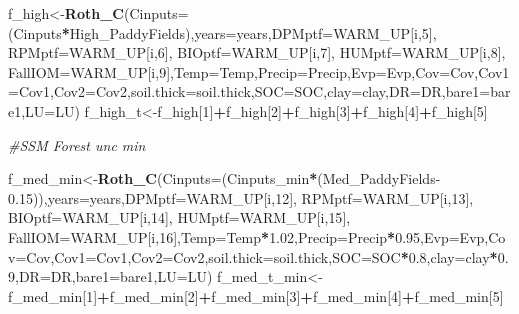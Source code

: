 \documentclass[
  10pt,
  b5paper,
]{book}
\newenvironment{Shaded}{\begin{snugshade}}{\end{snugshade}}
\newcommand{\CommentTok}[1]{\textcolor[rgb]{0.56,0.35,0.01}{\textit{#1}}}
\newcommand{\DataTypeTok}[1]{\textcolor[rgb]{0.13,0.29,0.53}{#1}}
\newcommand{\DecValTok}[1]{\textcolor[rgb]{0.00,0.00,0.81}{#1}}
\newcommand{\FloatTok}[1]{\textcolor[rgb]{0.00,0.00,0.81}{#1}}
\newcommand{\KeywordTok}[1]{\textcolor[rgb]{0.13,0.29,0.53}{\textbf{#1}}}
\newcommand{\NormalTok}[1]{#1}
\newcommand{\OperatorTok}[1]{\textcolor[rgb]{0.81,0.36,0.00}{\textbf{#1}}}
\begin{document}
\begin{Shaded}
\begin{Highlighting}[]
\NormalTok{f_high<-}\KeywordTok{Roth_C}\NormalTok{(}\DataTypeTok{Cinputs=}\NormalTok{(Cinputs}\OperatorTok{*}\NormalTok{High_PaddyFields),}\DataTypeTok{years=}\NormalTok{years,}\DataTypeTok{DPMptf=}\NormalTok{WARM_UP[i,}\DecValTok{5}\NormalTok{], }\DataTypeTok{RPMptf=}\NormalTok{WARM_UP[i,}\DecValTok{6}\NormalTok{], }\DataTypeTok{BIOptf=}\NormalTok{WARM_UP[i,}\DecValTok{7}\NormalTok{], }\DataTypeTok{HUMptf=}\NormalTok{WARM_UP[i,}\DecValTok{8}\NormalTok{], }\DataTypeTok{FallIOM=}\NormalTok{WARM_UP[i,}\DecValTok{9}\NormalTok{],}\DataTypeTok{Temp=}\NormalTok{Temp,}\DataTypeTok{Precip=}\NormalTok{Precip,}\DataTypeTok{Evp=}\NormalTok{Evp,}\DataTypeTok{Cov=}\NormalTok{Cov,}\DataTypeTok{Cov1=}\NormalTok{Cov1,}\DataTypeTok{Cov2=}\NormalTok{Cov2,}\DataTypeTok{soil.thick=}\NormalTok{soil.thick,}\DataTypeTok{SOC=}\NormalTok{SOC,}\DataTypeTok{clay=}\NormalTok{clay,}\DataTypeTok{DR=}\NormalTok{DR,}\DataTypeTok{bare1=}\NormalTok{bare1,}\DataTypeTok{LU=}\NormalTok{LU)}
\NormalTok{f_high_t<-f_high[}\DecValTok{1}\NormalTok{]}\OperatorTok{+}\NormalTok{f_high[}\DecValTok{2}\NormalTok{]}\OperatorTok{+}\NormalTok{f_high[}\DecValTok{3}\NormalTok{]}\OperatorTok{+}\NormalTok{f_high[}\DecValTok{4}\NormalTok{]}\OperatorTok{+}\NormalTok{f_high[}\DecValTok{5}\NormalTok{]}

\CommentTok{#SSM Forest unc min}

\NormalTok{f_med_min<-}\KeywordTok{Roth_C}\NormalTok{(}\DataTypeTok{Cinputs=}\NormalTok{(Cinputs_min}\OperatorTok{*}\NormalTok{(Med_PaddyFields}\FloatTok{-0.15}\NormalTok{)),}\DataTypeTok{years=}\NormalTok{years,}\DataTypeTok{DPMptf=}\NormalTok{WARM_UP[i,}\DecValTok{12}\NormalTok{], }\DataTypeTok{RPMptf=}\NormalTok{WARM_UP[i,}\DecValTok{13}\NormalTok{], }\DataTypeTok{BIOptf=}\NormalTok{WARM_UP[i,}\DecValTok{14}\NormalTok{], }\DataTypeTok{HUMptf=}\NormalTok{WARM_UP[i,}\DecValTok{15}\NormalTok{], }\DataTypeTok{FallIOM=}\NormalTok{WARM_UP[i,}\DecValTok{16}\NormalTok{],}\DataTypeTok{Temp=}\NormalTok{Temp}\OperatorTok{*}\FloatTok{1.02}\NormalTok{,}\DataTypeTok{Precip=}\NormalTok{Precip}\OperatorTok{*}\FloatTok{0.95}\NormalTok{,}\DataTypeTok{Evp=}\NormalTok{Evp,}\DataTypeTok{Cov=}\NormalTok{Cov,}\DataTypeTok{Cov1=}\NormalTok{Cov1,}\DataTypeTok{Cov2=}\NormalTok{Cov2,}\DataTypeTok{soil.thick=}\NormalTok{soil.thick,}\DataTypeTok{SOC=}\NormalTok{SOC}\OperatorTok{*}\FloatTok{0.8}\NormalTok{,}\DataTypeTok{clay=}\NormalTok{clay}\OperatorTok{*}\FloatTok{0.9}\NormalTok{,}\DataTypeTok{DR=}\NormalTok{DR,}\DataTypeTok{bare1=}\NormalTok{bare1,}\DataTypeTok{LU=}\NormalTok{LU)}
\NormalTok{f_med_t_min<-f_med_min[}\DecValTok{1}\NormalTok{]}\OperatorTok{+}\NormalTok{f_med_min[}\DecValTok{2}\NormalTok{]}\OperatorTok{+}\NormalTok{f_med_min[}\DecValTok{3}\NormalTok{]}\OperatorTok{+}\NormalTok{f_med_min[}\DecValTok{4}\NormalTok{]}\OperatorTok{+}\NormalTok{f_med_min[}\DecValTok{5}\NormalTok{]}


\end{Highlighting}
\end{Shaded}
\end{document}
